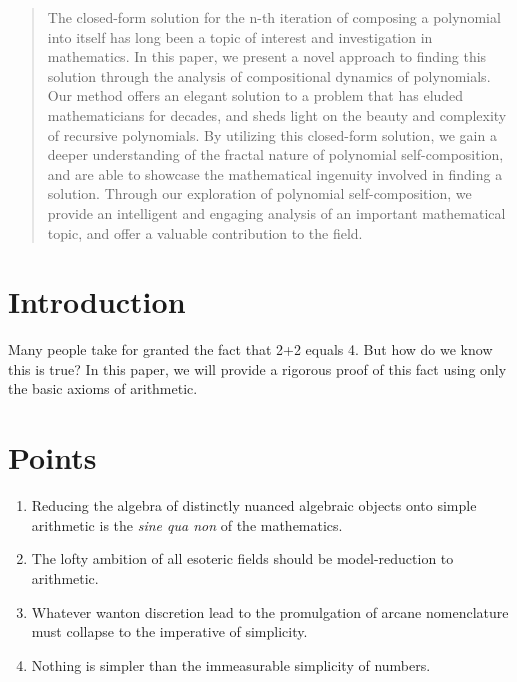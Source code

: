 \maketitle
\pagebreak

\begin{abstract}
 The closed-form solution for the n-th iteration of composing a polynomial into itself has long been a topic of interest and investigation in mathematics. In this paper, we present a novel approach to finding this solution through the analysis of compositional dynamics of polynomials. Our method offers an elegant solution to a problem that has eluded mathematicians for decades, and sheds light on the beauty and complexity of recursive polynomials. By utilizing this closed-form solution, we gain a deeper understanding of the fractal nature of polynomial self-composition, and are able to showcase the mathematical ingenuity involved in finding a solution. Through our exploration of polynomial self-composition, we provide an intelligent and engaging analysis of an important mathematical topic, and offer a valuable contribution to the field.
\end{abstract}

\pagebreak
\tableofcontents
\pagebreak

\section{Introduction}
Many people take for granted the fact that 2+2 equals 4. But how do we know this is true? In this paper, we will provide a rigorous proof of this fact using only the basic axioms of arithmetic.

\section{Points}
\begin{enumerate}
    \item Reducing the algebra of distinctly nuanced algebraic objects onto
    simple arithmetic is the \textit{sine qua non} of the mathematics.
    \item The lofty ambition of all esoteric fields should be model-reduction to arithmetic. 
    \item Whatever wanton discretion lead to the promulgation of arcane
    nomenclature must collapse to the imperative of simplicity.
    \item Nothing is simpler than the immeasurable simplicity of numbers.
\end{enumerate}

